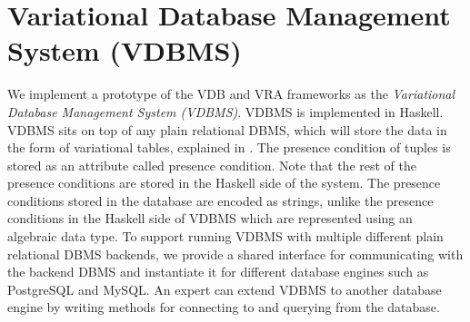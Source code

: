 \chapter{Variational Database Management System (VDBMS)}
\label{ch:vdbms}

%
We implement a prototype of the VDB and VRA frameworks as the
\emph{Variational Database Management System (VDBMS)}.
VDBMS is implemented in Haskell. VDBMS sits on 
top of any plain relational DBMS, which will store the data 
in the form of variational tables, explained in . The presence condition
of tuples is stored as an attribute called presence condition.
Note that the rest of the presence conditions are stored in the Haskell side of the system.
The presence conditions stored in the database are encoded as strings, unlike 
the presence conditions in the Haskell side of VDBMS which are represented using
an algebraic data type.
To support running VDBMS with multiple different plain relational DBMS backends,
we provide
a shared interface
for communicating with the backend DBMS and
instantiate it for different database engines such as PostgreSQL and
MySQL. 
An expert can extend VDBMS to another database engine by
writing methods for connecting to and querying from the database.

%

%




